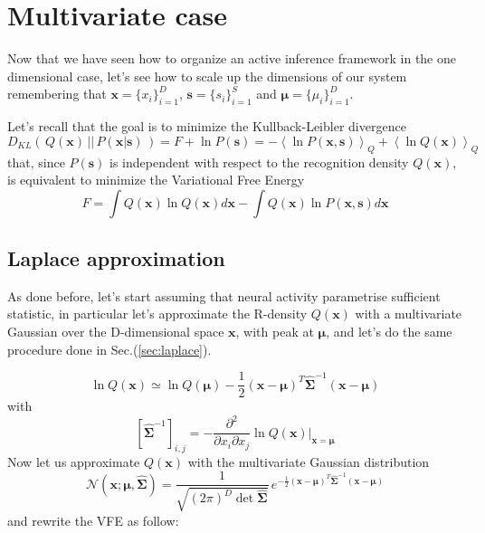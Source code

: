 \documentclass[a4paper, 10pt]{article}
\begin{document}
\newpage
\section{Multivariate case}
Now that we have seen how to organize an active inference framework in the one dimensional case, let's see how to scale up the dimensions of our system remembering that $\mathbf x = \lbrace x_i \rbrace_{i=1}^D$, $\mathbf s = \lbrace s_i \rbrace_{i=1}^S$ and $\bm \mu = \lbrace \mu_i \rbrace_{i=1}^D$.

Let's recall that the goal is to minimize the Kullback-Leibler  divergence
\begin{equation}
D_{KL} (\, Q(\mathbf x)\, ||\, P(\mathbf x|\mathbf s)\, )  =  F + \ln P(\mathbf s) = - \left< \ln P(\mathbf x,\mathbf s) \right>_{Q} + \left< \ln Q(\mathbf x) \right>_{Q} 
\end{equation}
that, since $P(\mathbf s)$ is independent with respect to the recognition density $Q(\mathbf x)$, is equivalent to minimize the Variational Free Energy
\begin{equation}
F = \int Q(\mathbf x) \ln Q(\mathbf x) d\mathbf x - \int Q(\mathbf x) \ln P(\mathbf x,\mathbf s) d\mathbf x
\end{equation}


\subsection{Laplace approximation}
As done before, let's start assuming that neural activity parametrise sufficient statistic, in particular let's approximate the R-density $Q(\mathbf x)$ with a multivariate Gaussian over the D-dimensional space $\mathbf x$, with peak at $\boldsymbol \mu$, and let's do the same procedure done in Sec.(\ref{sec:laplace}).

\begin{equation}
\ln Q(\mathbf x) \simeq \ln Q(\boldsymbol{\mu}) - \frac{1}{2} (\mathbf x-\boldsymbol \mu)^T \boldsymbol{\hat{\Sigma}}^{-1} (\mathbf x-\boldsymbol \mu)
\end{equation}
with
\begin{equation}
\left[ \boldsymbol{\hat{\Sigma}}^{-1} \right]_{i,j} = - \frac{\partial^{2} }{\partial x_i \partial x_j} \ln Q(\mathbf x) \bigg\rvert_{\mathbf x=\boldsymbol \mu} 
\end{equation}
Now let us approximate $Q(\mathbf x)$ with the multivariate Gaussian distribution
\begin{equation}
\mathcal{N}(\mathbf x;\boldsymbol \mu, \boldsymbol{\hat{\Sigma}}) = \frac{1}{\sqrt{( 2 \pi)^{D} \det \boldsymbol{\hat{\Sigma}}}} \, e^{ - \frac{1}{2} (\mathbf x-\boldsymbol \mu)^T \boldsymbol{\hat{\Sigma}}^{-1} (\mathbf x-\boldsymbol \mu)}
\end{equation}
and rewrite the VFE as follow:
\end{document}
